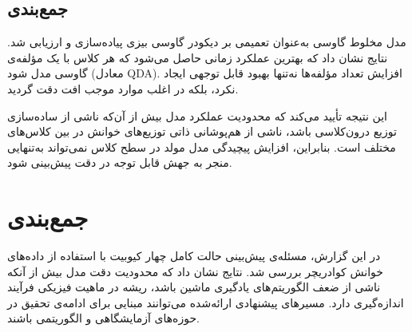 \subsection{جمع‌بندی}

مدل مخلوط گاوسی به‌عنوان تعمیمی بر دیکودر گاوسی بیزی پیاده‌سازی و ارزیابی شد. نتایج نشان داد که بهترین عملکرد زمانی حاصل می‌شود که هر کلاس با یک مؤلفه‌ی گاوسی مدل شود (معادل QDA). افزایش تعداد مؤلفه‌ها نه‌تنها بهبود قابل توجهی ایجاد نکرد، بلکه در اغلب موارد موجب افت دقت گردید.

این نتیجه تأیید می‌کند که محدودیت عملکرد مدل بیش از آن‌که ناشی از ساده‌سازی توزیع درون‌کلاسی باشد، ناشی از هم‌پوشانی ذاتی توزیع‌های خوانش در بین کلاس‌های مختلف است. بنابراین، افزایش پیچیدگی مدل مولد در سطح کلاس نمی‌تواند به‌تنهایی منجر به جهش قابل توجه در دقت پیش‌بینی شود.

\section{جمع‌بندی}
در این گزارش، مسئله‌ی پیش‌بینی حالت کامل چهار کیوبیت با استفاده از داده‌های خوانش کوادریچر بررسی شد. نتایج نشان داد که محدودیت دقت مدل بیش از آنکه ناشی از ضعف الگوریتم‌های یادگیری ماشین باشد، ریشه در ماهیت فیزیکی فرآیند اندازه‌گیری دارد. مسیرهای پیشنهادی ارائه‌شده می‌توانند مبنایی برای ادامه‌ی تحقیق در حوزه‌های آزمایشگاهی و الگوریتمی باشند.